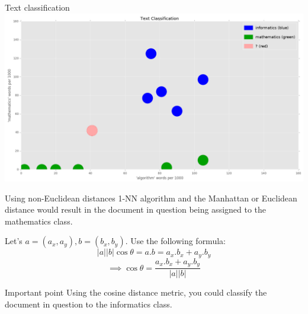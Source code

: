 \documentclass{beamer}
\begin{document}
\begin{frame}{Text classification}
\includegraphics[width=\textwidth]{text1.png}
\end{frame}


\begin{frame}{Using non-Euclidean distances}\vspace{2pt}
    1-NN algorithm and the Manhattan or Euclidean distance would
result in the document in question being assigned to the \alert{mathematics} class.

Let's  $a=(a_x ,a_y ), b=(b_x ,b_y )$. Use the following formula:
$$ \lvert{a} \rvert \lvert{b} \rvert \cos \theta = a . b = a_x . b_x + a_y . b_y $$
$$ \implies \cos \theta =\frac{a_x . b_x + a_y . b_y}{\lvert{a} \rvert \lvert{b} \rvert} $$

\begin{alertblock}{Important point}
Using the cosine distance metric, you could classify the document in question to the informatics class.

\end{alertblock}
\end{frame}
\end{document}
